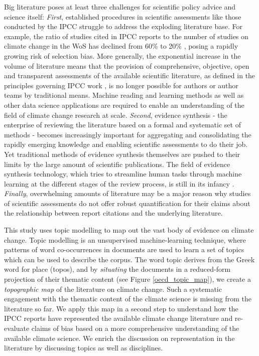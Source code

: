 \documentclass{article}
\begin{document}
\begin{linenumbers}
		Big literature poses at least three challenges for scientific policy advice and science itself: \emph{First}, established procedures in scientific assessments like those conducted by the IPCC struggle to address the exploding literature base. For example, the ratio of studies cited in IPCC reports to the number of studies on climate change in the WoS has declined from 60\% to 20\%  \cite{Minx2017l}, posing a rapidly growing risk of selection bias. More generally, the exponential increase in the volume of literature means that the provision of comprehensive, objective, open and transparent assessments of the available scientific literature, as defined in the principles governing IPCC work \cite{IPCC2013}, is no longer possible for authors or author teams by traditional means. 
		Machine reading and learning methods as well as other data science applications are required to enable an understanding of the field of climate change research at scale. 
		\emph{Second}, evidence synthesis - the enterprise of reviewing the literature based on a formal and systematic set of methods \cite{Chalmers2002} - becomes increasingly important for aggregating and consolidating the rapidly emerging knowledge and enabling scientific assessments to do their job. 
		Yet traditional methods of evidence synthesis themselves are pushed to their limits by the large amount of scientific publications. The field of evidence synthesis technology, which tries to streamline human tasks through machine learning at the different stages of the review process, is still in its infancy \cite{Beller2018}. \emph{Finally}, overwhelming amounts of literature may be a major reason why studies of scientific assessments \cite{Bjurström2011, Hulme2010, Victor2015} do not offer robust quantification for their claims about the relationship between report citations and the underlying literature. 
		
		This study uses topic modelling \cite{Blei2010} to map out the vast body of evidence on climate change. Topic modelling is an unsupervised machine-learning technique, where patterns of word co-occurrences in documents are used to learn a set of topics which can be used to describe the corpus. The word topic derives from the Greek word for place (topos), and by \textit{situating} the documents in a reduced-form projection of their thematic content (see Figure \ref{oecd_topic_map}), we create a \textit{topographic map} of the literature on climate change. Such a systematic engagement with the thematic content of the climate science is missing from the literature so far. 
		We apply this map in a second step to understand how the IPCC reports have represented the available climate change literature and re-evaluate claims of bias based on a more comprehensive understanding of the available climate science. We enrich the discussion on representation in the literature by discussing topics as well as disciplines. 
		

\end{linenumbers}
\end{document}
